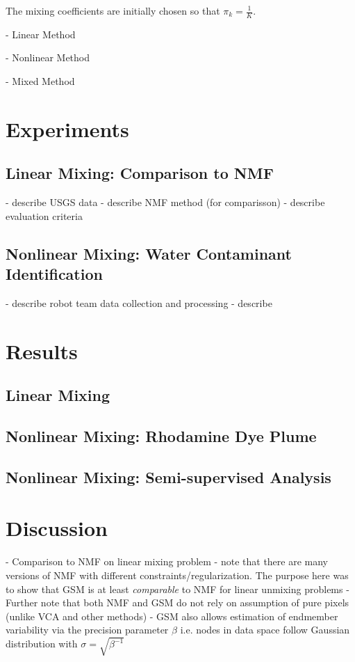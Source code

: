 \documentclass[remotesensing,article,submit,pdftex,moreauthors]{Definitions/mdpi}
\begin{document}
The mixing coefficients are initially chosen so that $\pi_k = \frac{1}{K}$.

- Linear Method

- Nonlinear Method

- Mixed Method


\section{Experiments}
\subsection{Linear Mixing: Comparison to NMF}
- describe USGS data
- describe NMF method (for comparisson)
- describe evaluation criteria

\subsection{Nonlinear Mixing: Water Contaminant Identification}
- describe robot team data collection and processing
- describe 

\section{Results}
\subsection{Linear Mixing}
\subsection{Nonlinear Mixing: Rhodamine Dye Plume}
\subsection{Nonlinear Mixing: Semi-supervised Analysis}


\section{Discussion}

- Comparison to NMF on linear mixing problem
    - note that there are many versions of NMF with different constraints/regularization. The purpose here was to show that GSM is at least \textit{comparable} to NMF for linear unmixing problems
    - Further note that both NMF and GSM do not rely on assumption of pure pixels (unlike VCA and other methods) 
    - GSM also allows estimation of endmember variability via the precision parameter $\beta$ i.e. nodes in data space follow Gaussian distribution with $\sigma = \sqrt{\beta^{-1}}$
\end{document}

